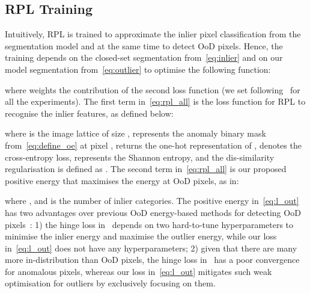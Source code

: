 \documentclass[10pt,twocolumn,letterpaper]{article}
\begin{document}
\subsection{RPL Training}
\label{sec:training process}



Intuitively, RPL is trained to approximate the inlier pixel classification from the segmentation model and at the same time to detect OoD pixels. Hence, the training depends on the closed-set segmentation  from~\eqref{eq:inlier} and on our model segmentation  from~\eqref{eq:outlier} to optimise the following function:
 
where  weights the contribution of the second loss function (we set  following~\cite{lis2019detecting} for all the experiments). The first term in~\eqref{eq:rpl_all} is the loss function for RPL to recognise the inlier features, as defined below:

where  is the image lattice of size ,  represents the anomaly binary mask from~\eqref{eq:define_oe} at pixel ,  returns the one-hot representation of ,  denotes the cross-entropy loss,  represents the Shannon entropy, and the dis-similarity regularisation is defined as . 
The second term in~\eqref{eq:rpl_all} is our proposed positive energy that maximises the energy at OoD pixels, as in:

where , and  is the number of inlier categories. 
The positive energy in~\eqref{eq:l_out} has two advantages over previous OoD energy-based methods for detecting OoD pixels~\cite{liu2020energy,tian2021pixel}: 1) the hinge loss in~\cite{liu2020energy,tian2021pixel} depends on two hard-to-tune hyperparameters to minimise the inlier energy and maximise the outlier energy, while our loss in~\eqref{eq:l_out} does not have any hyperparameters; 2) given that there are many more in-distribution than OoD pixels, the hinge loss  in~\cite{liu2020energy,tian2021pixel} has a poor convergence for anomalous pixels, whereas our loss in~\eqref{eq:l_out} mitigates such weak optimisation for outliers by exclusively focusing on them.
\end{document}
